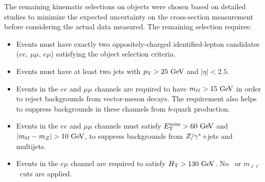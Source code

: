 

The remaining kinematic selections on objects were chosen based on detailed studies
to minimize the expected uncertainty on the cross-section measurement before
considering the actual data measured.
The remaining selection requires:


\begin{itemize}

\item Events must have exactly two oppositely-charged identified-lepton candidates ($ee$, $\mu\mu$, $e\mu$) satisfying the object selection criteria.

\item Events must have at least two jets with $\pT>25\GeV$ and $|\eta|<2.5$.

\item Events in the $ee$ and $\mu\mu$ channels are required to have $m_{\ell\ell} > 15\GeV$ in order to
reject backgrounds from vector-meson decays. The requirement also helps to suppress backgrounds in these channels from $b$-quark production.

\item Events in the $ee$ and $\mu\mu$ channels must satisfy $\MET>60\GeV$ and $|m_{\ell\ell} - m_Z| > 10\GeV$,
to suppress backgrounds from $Z/\gamma^{*}$+jets and multijets.

\item
Events in the $e\mu$ channel are required to satisfy $\HT>130\GeV$. No \MET\ or $m_{\ell\ell}$\ cuts are applied.

\end{itemize}

